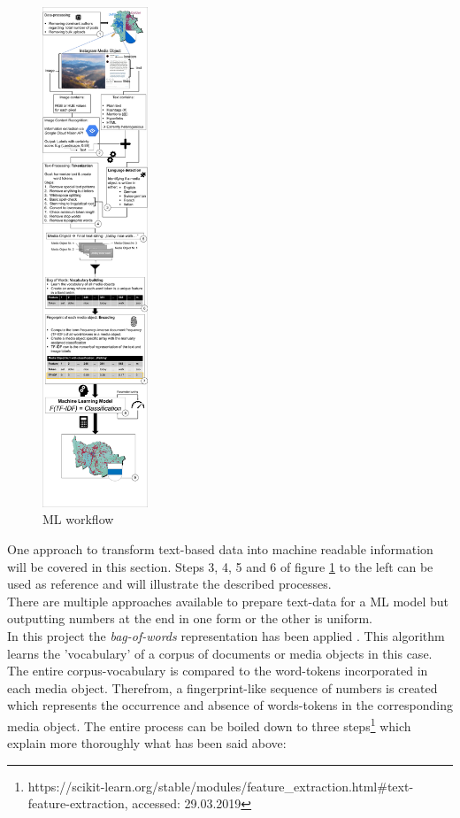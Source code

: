 \begin{figure} %
    \centerline{\includegraphics[trim={0 0 0 0},clip,width=0.28\textwidth]{img/ML_text_data_visualization_cropped.pdf}}
  \caption{ML workflow}
  \label{fig:ml_visualisation}
\end{figure}

One approach to transform text-based data into machine readable information will be covered in this section. Steps 3, 4, 5 and 6 of figure \ref{fig:ml_visualisation} to the left can be used as reference and will illustrate the described processes.\\
There are multiple approaches available to prepare text-data for a ML model but outputting numbers at the end in one form or the other is uniform.\\
In this project the \textit{bag-of-words} representation has been applied \parencite{Joulin2016}. This algorithm learns the 'vocabulary' of a corpus of documents or media objects in this case. The entire corpus-vocabulary is compared to the word-tokens incorporated in each media object. Therefrom, a fingerprint-like sequence of numbers is created which represents the occurrence and absence of words-tokens in the corresponding media object. The entire process can be boiled down to three steps\footnote{https://scikit-learn.org/stable/modules/feature\_extraction.html\#text-feature-extraction, accessed: 29.03.2019} which explain more thoroughly what has been said above:

